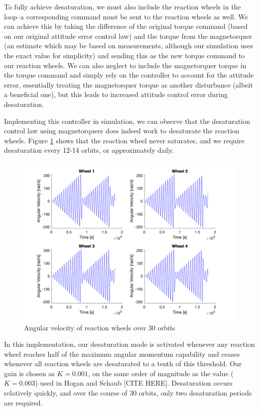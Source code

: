 To fully achieve desaturation, we must also include the reaction wheels in the loop–a corresponding command must be sent to the reaction wheels as well. We can achieve this by taking the difference of the original torque command (based on our original attitude error control law) and the torque from the magnetorquer (an estimate which may be based on measurements, although our simulation uses the exact value for simplicity) and sending this as the new torque command to our reaction wheels. We can also neglect to include the magnetorquer torque in the torque command and simply rely on the controller to account for the attitude error, essentially treating the magnetorquer torque as another disturbance (albeit a beneficial one), but this leads to increased attitude control error during desaturation.

Implementing this controller in simulation, we can observe that the desaturation control law using magnetorquers does indeed work to desaturate the reaction wheels. Figure \ref{fig:ps10_angular_velocity} shows that the reaction wheel never saturates, and we require desaturation every 12-14 orbits, or approximately daily.

\begin{figure}[H]
\centering
\includegraphics[scale=0.3]{Images/ps10_angular_velocity.png}
\caption{Angular velocity of reaction wheels over 30 orbits}
\label{fig:ps10_angular_velocity}
\end{figure}

In this implementation, our desaturation mode is activated whenever any reaction wheel reaches half of the maximum angular momentum capability and ceases whenever all reaction wheels are desaturated to a tenth of this threshold. Our gain is chosen as $K = 0.001$, on the same order of magnitude as the value ($K = 0.003$) used in Hogan and Schaub [CITE HERE]. Desaturation occurs relatively quickly, and over the course of 30 orbits, only two desaturation periods are required.

